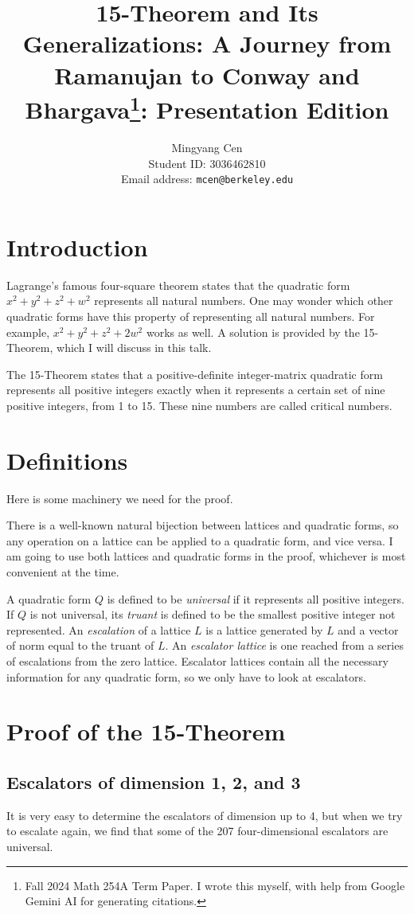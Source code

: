 \documentclass[letterpaper, 12pt]{article}
\title{15-Theorem and Its Generalizations: A Journey from Ramanujan to Conway and Bhargava\footnote{Fall 2024 Math 254A Term Paper. I wrote this myself, with help from Google Gemini AI for generating citations.}: Presentation Edition}
\author{Mingyang Cen \\ Student ID: 3036462810 \\ Email address: \texttt{mcen@berkeley.edu}}
\begin{document}
\maketitle

\section{Introduction}
Lagrange's famous four-square theorem states that the quadratic form $x^2+y^2+z^2+w^2$ represents all natural numbers. One may wonder which other quadratic forms have this property of representing all natural numbers. For example, $x^2 + y^2 + z^2 + 2w^2$ works as well. A solution is provided by the 15-Theorem, which I will discuss in this talk.

The 15-Theorem states that a positive-definite integer-matrix quadratic form represents all positive integers exactly when it represents a certain set of nine positive integers, from 1 to 15. These nine numbers are called critical numbers.

\section{Definitions}
Here is some machinery we need for the proof.

There is a well-known natural bijection between lattices and quadratic forms, so any operation on a lattice can be applied to a quadratic form, and vice versa. I am going to use both lattices and quadratic forms in the proof, whichever is most convenient at the time.

A quadratic form $Q$ is defined to be \emph{universal} if it represents all positive integers. If $Q$ is not universal, its \emph{truant} is defined to be the smallest positive integer not represented. An \emph{escalation} of a lattice $L$ is a lattice generated by $L$ and a vector of norm equal to the truant of $L$. An \emph{escalator lattice} is one reached from a series of escalations from the zero lattice. Escalator lattices contain all the necessary information for any quadratic form, so we only have to look at escalators.

\section{Proof of the 15-Theorem}
\subsection{Escalators of dimension 1, 2, and 3}
It is very easy to determine the escalators of dimension up to 4, but when we try to escalate again, we find that some of the 207 four-dimensional escalators are universal.
\end{document}
